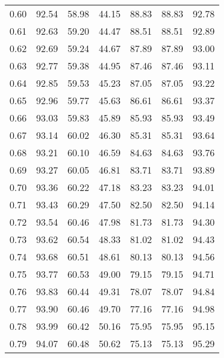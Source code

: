 \begin{tabular}{|c|c|c|c|c|c|c|}
      0.60 &     92.54 &     58.98 &      44.15 &   88.83 &      88.83 &         92.78 \\
      0.61 &     92.63 &     59.20 &      44.47 &   88.51 &      88.51 &         92.89 \\
      0.62 &     92.69 &     59.24 &      44.67 &   87.89 &      87.89 &         93.00 \\
      0.63 &     92.77 &     59.38 &      44.95 &   87.46 &      87.46 &         93.11 \\
      0.64 &     92.85 &     59.53 &      45.23 &   87.05 &      87.05 &         93.22 \\
      0.65 &     92.96 &     59.77 &      45.63 &   86.61 &      86.61 &         93.37 \\
      0.66 &     93.03 &     59.83 &      45.89 &   85.93 &      85.93 &         93.49 \\
      0.67 &     93.14 &     60.02 &      46.30 &   85.31 &      85.31 &         93.64 \\
      0.68 &     93.21 &     60.10 &      46.59 &   84.63 &      84.63 &         93.76 \\
      0.69 &     93.27 &     60.05 &      46.81 &   83.71 &      83.71 &         93.89 \\
      0.70 &     93.36 &     60.22 &      47.18 &   83.23 &      83.23 &         94.01 \\
      0.71 &     93.43 &     60.29 &      47.50 &   82.50 &      82.50 &         94.14 \\
      0.72 &     93.54 &     60.46 &      47.98 &   81.73 &      81.73 &         94.30 \\
      0.73 &     93.62 &     60.54 &      48.33 &   81.02 &      81.02 &         94.43 \\
      0.74 &     93.68 &     60.51 &      48.61 &   80.13 &      80.13 &         94.56 \\
      0.75 &     93.77 &     60.53 &      49.00 &   79.15 &      79.15 &         94.71 \\
      0.76 &     93.83 &     60.44 &      49.31 &   78.07 &      78.07 &         94.84 \\
      0.77 &     93.90 &     60.46 &      49.70 &   77.16 &      77.16 &         94.98 \\
      0.78 &     93.99 &     60.42 &      50.16 &   75.95 &      75.95 &         95.15 \\
      0.79 &     94.07 &     60.48 &      50.62 &   75.13 &      75.13 &         95.29 \\

\end{tabular}
